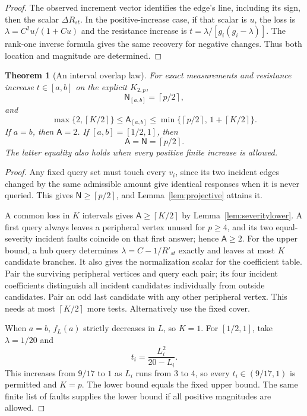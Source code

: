 \documentclass[11pt,letterpaper]{article}
\newtheorem{theorem}{Theorem}
\newcommand{\ceil}[1]{\left\lceil #1\right\rceil}
\newcommand{\A}{\mathsf A}
\newcommand{\N}{\mathsf N}
\begin{document}
\begin{proof}
The observed increment vector identifies the edge's line, including its sign, then the scalar $\Delta R_{st}$. In the positive-increase case, if that scalar is $u$, the loss is $\lambda=C^2u/(1+Cu)$ and the resistance increase is $t=\lambda/[g_i(g_i-\lambda)]$. The rank-one inverse formula gives the same recovery for negative changes. Thus both location and magnitude are determined.
\end{proof}

\begin{theorem}[An interval overlap law]\label{thm:severity}
For exact measurements and resistance increase $t\in[a,b]$ on the explicit $K_{2,p}$,
\[
 \N_{[a,b]}=\ceil{p/2},
\]
and
\[
 \max\{2,\ceil{K/2}\}
 \le\A_{[a,b]}
 \le\min\{\ceil{p/2},\,1+\ceil{K/2}\}.
\]
If $a=b$, then $\A=2$. If $[a,b]=[1/2,1]$, then
\[
 \A=\N=\ceil{p/2}.
\]
The latter equality also holds when every positive finite increase is allowed.
\end{theorem}
\begin{proof}
Any fixed query set must touch every $v_i$, since its two incident edges changed by the same admissible amount give identical responses when it is never queried. This gives $\N\ge\ceil{p/2}$, and Lemma~\ref{lem:projective} attains it.

A common loss in $K$ intervals gives $\A\ge\ceil{K/2}$ by Lemma~\ref{lem:severitylower}. A first query always leaves a peripheral vertex unused for $p\ge4$, and its two equal-severity incident faults coincide on that first answer; hence $\A\ge2$. For the upper bound, a hub query determines $\lambda=C-1/R'_{st}$ exactly and leaves at most $K$ candidate branches. It also gives the normalization scalar for the coefficient table. Pair the surviving peripheral vertices and query each pair; its four incident coefficients distinguish all incident candidates individually from outside candidates. Pair an odd last candidate with any other peripheral vertex. This needs at most $\ceil{K/2}$ more tests. Alternatively use the fixed cover.

When $a=b$, $f_L(a)$ strictly decreases in $L$, so $K=1$. For $[1/2,1]$, take $\lambda=1/20$ and
\[
 t_i=\frac{L_i^2}{20-L_i}.
\]
This increases from $9/17$ to $1$ as $L_i$ runs from $3$ to $4$, so every $t_i\in(9/17,1)$ is permitted and $K=p$. The lower bound equals the fixed upper bound. The same finite list of faults supplies the lower bound if all positive magnitudes are allowed.
\end{proof}
\end{document}
